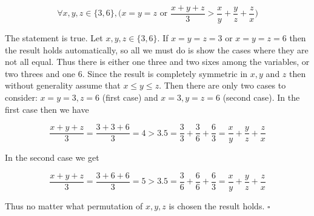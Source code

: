 \documentclass[letterpaper, reqno,11pt]{article}
\begin{document}
$$
    \forall x, y, z\in\{3, 6\}, \bigg(x=y=z\text{ or }\frac{x+y+z}{3}>\frac xy+\frac yz+\frac zx\bigg)
$$

\medskip

The statement is true. Let $x, y, z\in\{3, 6\}$. If $x=y=z=3$ or $x=y=z=6$ then the result holds automatically, so all we must do is show the cases where they are not all equal. Thus there is either one three and two sixes among the variables, or two threes and one 6. Since the result is completely symmetric in $x, y$ and $z$ then without generality assume that $x\leq y\leq z$. Then there are only two cases to consider: $x=y=3, z=6$ (first case) and $x=3, y=z=6$ (second case). In the first case then we have 

$$
    \frac{x+y+z}{3}=\frac{3+3+6}{3}=4>3.5=\frac33+\frac36+\frac63=\frac xy+\frac yz+\frac zx
$$

In the second case we get 

$$
    \frac{x+y+z}{3}=\frac{3+6+6}{3}=5>3.5=\frac36+\frac66+\frac63=\frac xy+\frac yz+\frac zx
$$

Thus no matter what permutation of $x, y, z$ is chosen the result holds. $\square$
\end{document}
